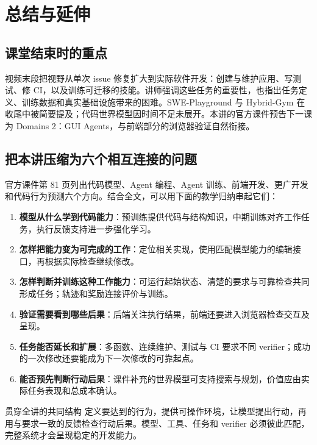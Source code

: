 \documentclass[11pt,a4paper]{article}
\begin{document}
\endgroup
\clearpage
\begingroup
\setlength{\parskip}{.2em}
\section{总结与延伸}

\subsection{课堂结束时的重点}
视频末段把视野从单次 issue 修复扩大到实际软件开发：创建与维护应用、写测试、修 CI，以及训练可迁移的技能。讲师强调这些任务的重要性，也指出任务定义、训练数据和真实基础设施带来的困难。SWE-Playground 与 Hybrid-Gym 在收尾中被简要提及；代码世界模型因时间不足未展开。本讲的官方课件预告下一课为 Domains 2：GUI Agents，与前端部分的浏览器验证自然衔接。

\subsection{把本讲压缩为六个相互连接的问题}
官方课件第 81 页列出代码模型、Agent 编程、Agent 训练、前端开发、更广开发和代码行为预测六个方向。结合全文，可以用下面的教学归纳串起它们：
\begin{enumerate}\setlength{\itemsep}{2pt}\setlength{\parsep}{0pt}\setlength{\topsep}{4pt}
\item \textbf{模型从什么学到代码能力}：预训练提供代码与结构知识，中期训练对齐工作任务，执行反馈支持进一步强化学习。
\item \textbf{怎样把能力变为可完成的工作}：定位相关实现，使用匹配模型能力的编辑接口，再根据实际检查继续修改。
\item \textbf{怎样判断并训练这种工作能力}：可运行起始状态、清楚的要求与可靠检查共同形成任务；轨迹和奖励连接评价与训练。
\item \textbf{验证需要看到哪些后果}：后端关注执行结果，前端还要进入浏览器检查交互及呈现。
\item \textbf{任务能否延长和扩展}：多函数、连续维护、测试与 CI 要求不同 verifier；成功的一次修改还要能成为下一次修改的可靠起点。
\item \textbf{能否预先判断行动后果}：课件补充的世界模型可支持搜索与规划，价值应由实际任务表现和总成本确认。
\end{enumerate}

\begin{importantbox}{贯穿全讲的共同结构}
定义要达到的行为，提供可操作环境，让模型提出行动，再用与要求一致的反馈检查行动后果。模型、工具、任务和 verifier 必须彼此匹配，完整系统才会呈现稳定的开发能力。
\end{importantbox}
\end{document}
